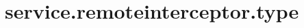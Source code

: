 \section{service.remoteinterceptor.type}
\label{configuration:ServiceRemoteinterceptorType}
\AvailableInCsharpOnly{\TODO}